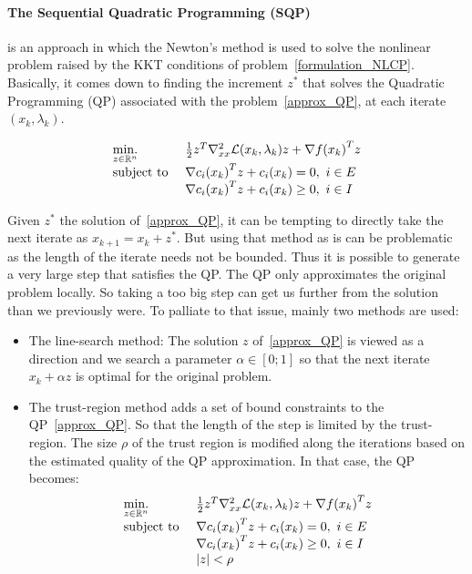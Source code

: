 \paragraph{The Sequential Quadratic Programming (SQP)} is an approach in which the Newton's method is used to solve the nonlinear problem raised by the KKT conditions of problem~\ref{formulation_NLCP}.
Basically, it comes down to finding the increment $z^*$ that solves the Quadratic Programming (QP) associated with the problem~\ref{approx_QP}, at each iterate $(x_k, \lambda_k)$.

\begin{equation}
\label{approx_QP}
  \begin{array}{ll}
    \operatorname*{min.}\limits_{z\in \mathbb{R}^n}{} & \frac{1}{2}z^T \nabla_{xx}^2\mathcal{L}(x_k, \lambda_k)z + \nabla {f(x_k)}^T z \\
    \text{subject to } & {\nabla c_i(x_k)}^T z+c_i(x_k)=0,\ i\in E \\
                       & {\nabla c_i(x_k)}^T z+c_i(x_k)\geq 0,\ i\in I
  \end{array}
\end{equation}

Given $z^*$ the solution of~\ref{approx_QP}, it can be tempting to directly take the next iterate as $x_{k+1} = x_k + z^*$.
But using that method as is can be problematic as the length of the iterate needs not be bounded.
Thus it is possible to generate a very large step that satisfies the QP\@.
The QP only approximates the original problem locally.
So taking a too big step can get us further from the solution than we previously were.
To palliate to that issue, mainly two methods are used:
\begin{itemize}
  \item The line-search method: The solution $z$ of~\ref{approx_QP} is viewed as a direction and we search a parameter $\alpha\in [0;1]$ so that the next iterate $x_k + \alpha z$ is optimal for the original problem.
  \item The trust-region method adds a set of bound constraints to the QP~\ref{approx_QP}. So that the length of the step is limited by the trust-region. The size $\rho$ of the trust region is modified along the iterations based on the estimated quality of the QP approximation. In that case, the QP becomes:
\begin{equation}
  \begin{array}{ll}
    \operatorname*{min.}\limits_{z\in \mathbb{R}^n}{} & \frac{1}{2}z^T \nabla_{xx}^2 \mathcal{L}(x_k, \lambda_k)z + {\nabla f(x_k)}^T z \\
    \text{subject to } & {\nabla c_i(x_k)}^T z+c_i(x_k)=0,\ i\in E \\
                       & {\nabla c_i(x_k)}^T z+c_i(x_k)\geq 0,\ i\in I\\
                       & |z|<\rho
  \end{array}
\end{equation}
\end{itemize}

